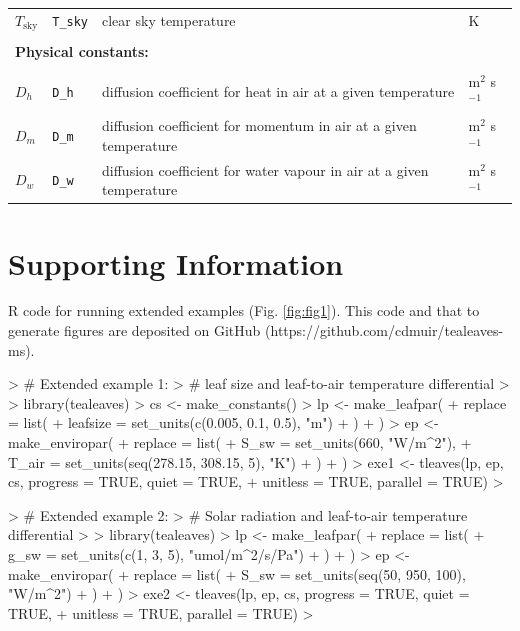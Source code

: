 \documentclass[11pt, oneside]{article}
\newcommand{\code}[1]{{\texttt{#1}}}
\begin{document}
\begin{table}[ht]
\begin{center}
{\begin{tabular}{llll}
  $T_\mathrm{sky}$ & \code{T\_sky}  & clear sky temperature & K \\
  \\
  \multicolumn{4}{l}{\textbf{Physical constants:}} \\
  \\
  $D_h$            & \code{D\_h}    & diffusion coefficient for heat in air at a given temperature & m$^2$ s$^{-1}$ \\
  $D_m$            & \code{D\_m}    & diffusion coefficient for momentum in air at a given temperature & m$^2$ s$^{-1}$ \\
  $D_w$            & \code{D\_w} & diffusion coefficient for water vapour in air at a given temperature        & m$^2$ s$^{-1}$ \\


\bottomrule

\end{tabular}}
\end{center}
\label{table:table_output}
\end{table}


\clearpage

\section*{Supporting Information}

R code for running extended examples (Fig. \ref{fig:fig1}). This code and that to generate figures are deposited on GitHub (https://github.com/cdmuir/tealeaves-ms).
 
\begin{Schunk}
\begin{Sinput}
> # Extended example 1: 
> # leaf size and leaf-to-air temperature differential
> 
> library(tealeaves)
> cs <- make_constants()
> lp  <- make_leafpar(
+   replace = list(
+     leafsize = set_units(c(0.005, 0.1, 0.5), "m")
+   )
+ )
> ep <- make_enviropar(
+   replace = list(
+     S_sw = set_units(660, "W/m^2"),
+     T_air = set_units(seq(278.15, 308.15, 5), "K")
+   )
+ )
> exe1 <- tleaves(lp, ep, cs, progress = TRUE, quiet = TRUE, 
+                 unitless = TRUE, parallel = TRUE)
> 
\end{Sinput}
\end{Schunk}

\clearpage

\begin{Schunk}
\begin{Sinput}
> # Extended example 2: 
> # Solar radiation and leaf-to-air temperature differential
> 
> library(tealeaves)
> lp  <- make_leafpar(
+   replace = list(
+     g_sw = set_units(c(1, 3, 5), "umol/m^2/s/Pa")
+   )
+ )
> ep <- make_enviropar(
+   replace = list(
+     S_sw = set_units(seq(50, 950, 100), "W/m^2")
+   )
+ )
> exe2 <- tleaves(lp, ep, cs, progress = TRUE, quiet = TRUE, 
+                 unitless = TRUE, parallel = TRUE)
> 
\end{Sinput}
\end{Schunk}
\end{document}
